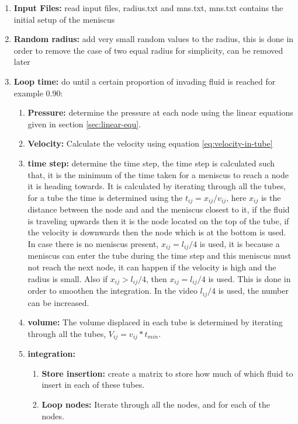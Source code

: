 \documentclass[12pt, a4paper]{article}
\begin{document}
\begin{enumerate}
	\item \textbf{Input Files:} read input files, radius.txt and mns.txt, mns.txt contains the initial setup of the meniscus
	\item \textbf{Random radius:} add very small random values to the radius, this is done in order to remove the case of two equal radius for simplicity, can be removed later
	\item \textbf{Loop time:} do until a certain proportion of invading fluid is reached for example 0.90:
	\begin{enumerate}
		\item \textbf{Pressure:} determine the pressure at each node using the linear equations given in section \ref{sec:linear-equ}.
		\item \textbf{Velocity:} Calculate the velocity using equation \ref{eq:velocity-in-tube} 
		\item \textbf{time step:} determine the time step, the time step is calculated such that, it is the minimum of the time taken for a meniscus to reach a node it is heading towards. It is calculated by iterating through all the tubes, for a tube the time is determined using the $t_{ij} = x_{ij} / v_{ij}$, here $x_{ij}$ is the distance between the node and and the meniscus closest to it, if the fluid is traveling upwards then it is the node located on the top of the tube, if the velocity is downwards then the node which is at the bottom is used. In case there is no meniscus present, $x_{ij} = l_{ij} / 4$ is used, it is because a meniscus can enter the tube during the time step and this meniscus must not reach the next node, it can happen if the velocity is high and the radius is small. Also if $x_{ij} > l_{ij} / 4$, then $x_{ij} = l_{ij}/4$ is used. This is done in order to smoothen the integration. In the video $l_{ij}/4$ is used, the number can be increased.
		\item \textbf{volume:} The volume displaced in each tube is determined by iterating through all the tubes, $V_{ij} = v_{ij} * t_{min}$.
		\item \textbf{integration:} 
			\begin{enumerate}
			\item \textbf{Store insertion:} create a matrix to store how much of which fluid to insert in each of these tubes.
			\item \textbf{Loop nodes:} Iterate through all the nodes, and for each of the nodes. 
				\begin{enumerate}

\end{enumerate}
\end{enumerate}
\end{enumerate}
\end{enumerate}
\end{document}
